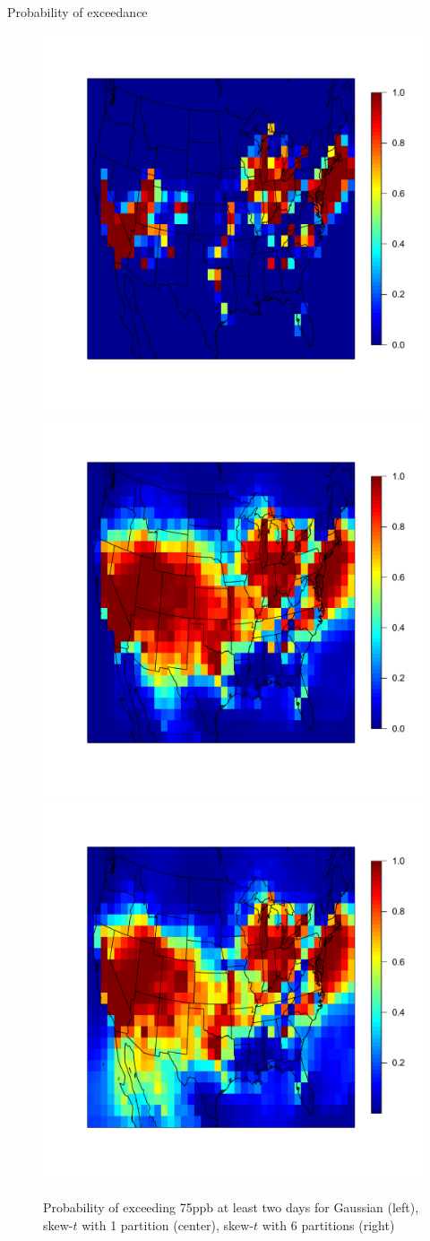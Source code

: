 \documentclass{beamer}
\begin{document}
\begin{frame}{Probability of exceedance}
  \centering
  \begin{figure}
    \includegraphics[width=0.33\linewidth, trim=0.2in 0 0.2in 1in]{./plots/pot/ozone-p2-gaus.pdf}
    \includegraphics[width=0.33\linewidth, trim=0.2in 0 0.2in 1in]{./plots/pot/ozone-p2-t1.pdf}
    \includegraphics[width=0.33\linewidth, trim=0.2in 0 0.2in 1in]{./plots/pot/ozone-p2-t6.pdf}
    \caption{Probability of exceeding 75ppb at least two days for Gaussian (left), skew-$t$ with 1 partition (center), skew-$t$ with 6 partitions (right)}
  \end{figure}
\end{frame}
\end{document}
